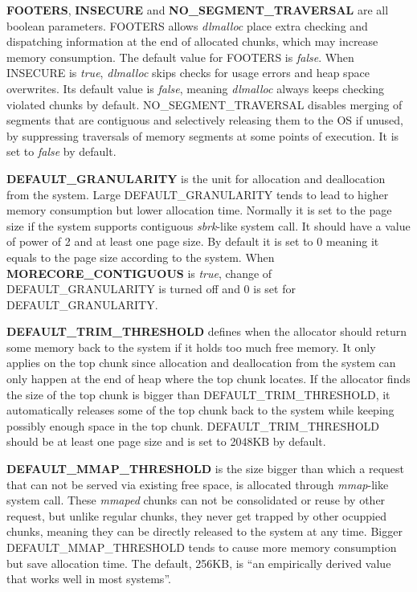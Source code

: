 \documentclass{acm_proc_article-sp}
\begin{document}
\textbf{FOOTERS}, \textbf{INSECURE} and \textbf{NO\_SEGMENT\_TRAVERSAL} are all boolean parameters. FOOTERS allows \emph{dlmalloc} place extra checking and dispatching information at the end of allocated chunks, which may increase memory consumption. The default value for FOOTERS is \emph{false}. When INSECURE is \emph{true}, \emph{dlmalloc} skips checks for usage errors and heap space overwrites. Its default value is \emph{false}, meaning \emph{dlmalloc} always keeps checking violated chunks by default. NO\_SEGMENT\_TRAVERSAL disables merging of segments that are contiguous and selectively releasing them to the OS if unused, by suppressing traversals of memory segments at some points of execution. It is set to \emph{false} by default. 

\textbf{DEFAULT\_GRANULARITY} is the unit for allocation and deallocation from the system. Large DEFAULT\_GRANULARITY tends to lead to higher memory consumption but lower allocation time. Normally it is set to the page size if the system supports contiguous \emph{sbrk}-like system call. It should have a value of power of 2 and at least one page size. By default it is set to 0 meaning it equals to the page size according to the system. When \textbf{MORECORE\_CONTIGUOUS} is \emph{true}, change of DEFAULT\_GRANULARITY is turned off and 0 is set for DEFAULT\_GRANULARITY.

\textbf{DEFAULT\_TRIM\_THRESHOLD} defines when the allocator should return some memory back to the system if it holds too much free memory. It only applies on the top chunk since allocation and deallocation from the system can only happen at the end of heap where the top chunk locates. If the allocator finds the size of the top chunk is bigger than DEFAULT\_TRIM\_THRESHOLD, it automatically releases some of the top chunk back to the system while keeping possibly enough space in the top chunk. DEFAULT\_TRIM\_THRESHOLD should be at least one page size and is set to 2048KB by default. 

\textbf{DEFAULT\_MMAP\_THRESHOLD} is the size bigger than which a request that can not be served via existing free space, is allocated through \emph{mmap}-like system call. These \emph{mmaped} chunks can not be consolidated or reuse by other request, but unlike regular chunks, they never get trapped by other ocuppied chunks, meaning they can be directly released to the system at any time. Bigger DEFAULT\_MMAP\_THRESHOLD tends to cause more memory consumption but save allocation time. The default, 256KB, is ``an empirically derived value that works well in most systems''.
\end{document}
